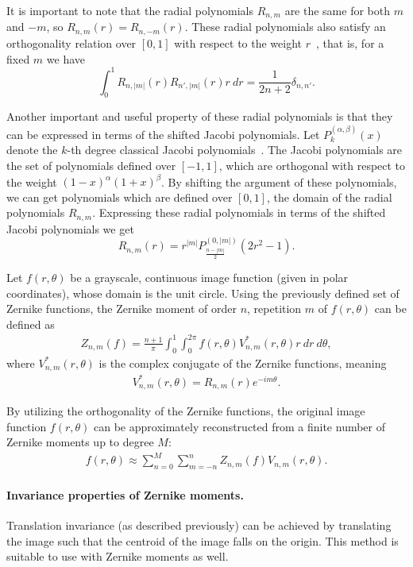 It is important to note that the radial polynomials $R_{n,m}$ are the same for both $m$ and $-m$, so $R_{n,m}(r) = R_{n,-m}(r)$. These radial polynomials also satisfy an orthogonality relation over $[0,1]$ with respect to the weight $r$~\cite{schipp}, that is, for a fixed $m$ we have
\begin{equation}\label{Rortho}
	\int_0^1 R_{n,|m|}(r) R_{n',|m|}(r)r\ dr  = \frac{1}{2n+2} \delta_{n,n'}.
\end{equation}


Another important and useful property of these radial polynomials is that they can be expressed in terms of the shifted Jacobi polynomials. Let $P_k^{(\alpha, \beta)}(x)$ denote the $k$-th degree classical Jacobi polynomials~\cite{Szego}. The Jacobi polynomials are the set of polynomials defined over $[-1,1]$, which are orthogonal with respect to the weight $(1-x)^\alpha(1+x)^\beta$. By shifting the argument of these polynomials, we can get polynomials which are defined over $[0,1]$, the domain of the radial polynomials $R_{n,m}$. Expressing these radial polynomials in terms of the shifted Jacobi polynomials we get
\begin{equation}\label{RJacobi}
	R_{n,m}(r) = r^{|m|} P_{\frac{n - |m|}{2}}^{(0,|m|)}(2r^2-1).
\end{equation} 


Let $f(r,\theta)$ be a grayscale, continuous image function (given in polar coordinates), whose domain is the unit circle.
Using the previously defined set of Zernike functions, the Zernike moment of order $n$, repetition $m$ of $f(r,\theta)$ can be defined as
\begin{gather*}
    Z_{n,m}(f) = \frac{n + 1}{\pi}\int_0^1\int_0^{2\pi}f(r,\theta)V_{n,m}^{*}(r,\theta)r\ dr\ d\theta,
\end{gather*}
where $V_{n,m}^{*}(r,\theta)$ is the complex conjugate of the Zernike functions, meaning
\begin{gather*}
    V_{n,m}^{*}(r,\theta) = R_{n,m}(r) e^{-i m\theta}.
\end{gather*}


By utilizing the orthogonality of the Zernike functions, the original image function $f(r,\theta)$ can be approximately reconstructed from a finite number of Zernike moments up to degree $M$:
\begin{gather*}
    f(r,\theta) \approx \sum_{n=0}^{M}\sum_{m=-n}^{n}Z_{n,m}(f)V_{n,m}(r,\theta).
\end{gather*}

\paragraph{Invariance properties of Zernike moments.} Translation invariance (as described previously) can be achieved by translating the image such that the centroid of the image falls on the origin. This method is suitable to use with Zernike moments as well.


